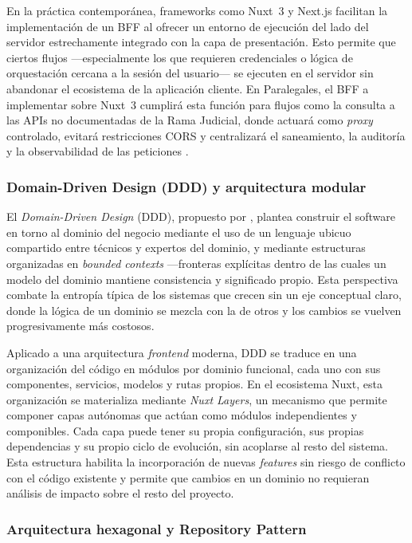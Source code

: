En la práctica contemporánea, frameworks como Nuxt~3 y Next.js facilitan la implementación de un BFF al ofrecer un entorno de ejecución del lado del servidor estrechamente integrado con la capa de presentación. Esto permite que ciertos flujos —especialmente los que requieren credenciales o lógica de orquestación cercana a la sesión del usuario— se ejecuten en el servidor sin abandonar el ecosistema de la aplicación cliente. En Paralegales, el BFF a implementar sobre Nuxt~3 cumplirá esta función para flujos como la consulta a las APIs no documentadas de la Rama Judicial, donde actuará como \textit{proxy} controlado, evitará restricciones CORS y centralizará el saneamiento, la auditoría y la observabilidad de las peticiones \cite{Newman2021}.

\subsubsection{Domain-Driven Design (DDD) y arquitectura modular}

El \textit{Domain-Driven Design} (DDD), propuesto por \textcite{Evans2003}, plantea construir el software en torno al dominio del negocio mediante el uso de un lenguaje ubicuo compartido entre técnicos y expertos del dominio, y mediante estructuras organizadas en \textit{bounded contexts} —fronteras explícitas dentro de las cuales un modelo del dominio mantiene consistencia y significado propio. Esta perspectiva combate la entropía típica de los sistemas que crecen sin un eje conceptual claro, donde la lógica de un dominio se mezcla con la de otros y los cambios se vuelven progresivamente más costosos.

Aplicado a una arquitectura \textit{frontend} moderna, DDD se traduce en una organización del código en módulos por dominio funcional, cada uno con sus componentes, servicios, modelos y rutas propios. En el ecosistema Nuxt, esta organización se materializa mediante \textit{Nuxt Layers}, un mecanismo que permite componer capas autónomas que actúan como módulos independientes y componibles. Cada capa puede tener su propia configuración, sus propias dependencias y su propio ciclo de evolución, sin acoplarse al resto del sistema. Esta estructura habilita la incorporación de nuevas \textit{features} sin riesgo de conflicto con el código existente y permite que cambios en un dominio no requieran análisis de impacto sobre el resto del proyecto.

\subsubsection{Arquitectura hexagonal y Repository Pattern}

